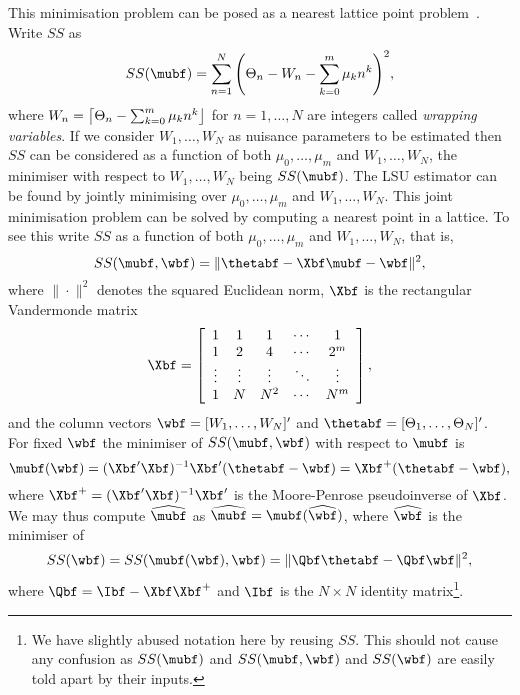 \documentclass[journal]{IEEEtran}
\begin{document}
This minimisation problem can be posed as a nearest lattice point problem~\cite{McKilliam2009asilomar_polyest_lattice, McKilliam2010thesis}.  Write $SS$ as
\[
SS(\mubf) = \sum_{n=1}^{N}{ \left( \Theta_{n} - W_n - \sum_{k = 0}^{m}{\mu_k n^k} \right)^2 },
\]
where $W_n = {\left\lceil \Theta_{n} - \sum_{k = 0}^{m}{\mu_k n^k}  \right\rfloor}$ for $n = 1, \dots, N$ are integers called \emph{wrapping variables}.  If we consider $W_1,\dots,W_N$ as nuisance parameters to be estimated then $SS$ can be considered as a function of both $\mu_0,\dots,\mu_m$ and $W_1,\dots,W_N$, the minimiser with respect to $W_1,\dots,W_N$ being $SS(\mubf)$.  The LSU estimator can be found by jointly minimising over $\mu_0,\dots,\mu_m$ and $W_1,\dots,W_N$.   This joint minimisation problem can be solved by computing a nearest point in a lattice.  To see this write $SS$ as a function of both $\mu_0,\dots,\mu_m$ and $W_1,\dots,W_N$, that is,
\begin{equation}\label{eq:SS_in_vector_form_with_u_nuisance}
SS(\mubf, \wbf) = \| \thetabf - \Xbf\mubf - \wbf \|^2,
\end{equation}
where $\|\cdot\|^2$ denotes the squared Euclidean norm, $\Xbf$ is the rectangular Vandermonde matrix
\begin{equation}\label{eq:Xvandermonde}
\Xbf = \left[ \begin{array}{ccccc} 
1 & 1 & 1 & \cdots & 1 \\
1 & 2 & 4 & \cdots & 2^m \\
\vdots & \vdots  & \vdots & \ddots & \vdots \\
1 & N & N^2 & \cdots & N^m \\
\end{array} \right],
\end{equation}
and the column vectors $\wbf = [W_1, \dots, W_N]^\prime$ and $\thetabf = [\Theta_1, \dots, \Theta_N]^\prime$.   For fixed $\wbf$ the minimiser of $SS(\mubf, \wbf)$ with respect to $\mubf$ is
\begin{equation} \label{eq:hat_theta_cal}
\mubf(\wbf) = (\Xbf^\prime\Xbf)^{-1}\Xbf^\prime( \thetabf - \wbf) = \Xbf^+( \thetabf - \wbf),
\end{equation}
where $\Xbf^+ = (\Xbf^\prime\Xbf)^{-1}\Xbf^\prime$ is the Moore-Penrose pseudoinverse of $\Xbf$.  We may thus compute $\widehat{\mubf}$ as $\widehat{\mubf} = \mubf(\widehat{\wbf})$, where $\widehat{\wbf}$ is the minimiser of
\[
SS(\wbf) = SS(\mubf(\wbf),\wbf) = \| \Qbf\thetabf - \Qbf\wbf \|^2,
\]
where $\Qbf = \Ibf - \Xbf\Xbf^+$ and $\Ibf$ is the $N \times N$ identity matrix\footnote{We have slightly abused notation here by reusing $SS$. This should not cause any confusion as $SS(\mubf)$ and $SS(\mubf,\wbf)$ and $SS(\wbf)$ are easily told apart by their inputs.}. 
\end{document}
